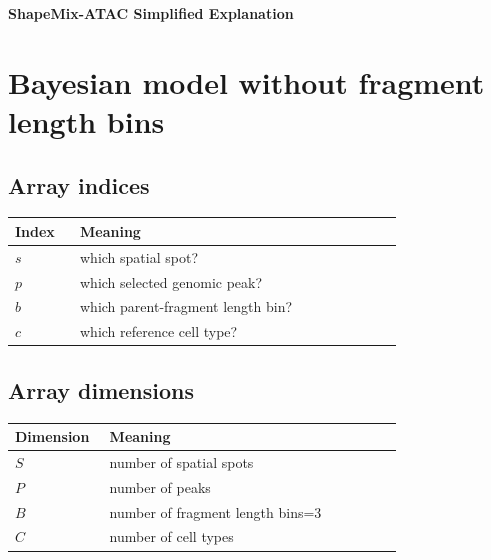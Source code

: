 \documentclass[11pt]{article}
\begin{document}
\hypersetup{pageanchor=false}

\begin{titlepage}
\centering
\vspace*{0.25in}
{\Huge\bfseries\color{navy} ShapeMix-ATAC Simplified Explanation\par}

\end{titlepage}

\hypersetup{pageanchor=true}
\setcounter{tocdepth}{1}
\tableofcontents
\newpage
{}

\section{Bayesian model without fragment length bins}



\subsection{Array indices}

\begin{center}
\begin{tabular}{C{0.11\linewidth}L{0.66\linewidth}}
\toprule
Index & Meaning \\
\midrule
\(s\) & which spatial spot? \\
\(p\) & which selected genomic peak? \\
\(b\) & which parent-fragment length bin? \\
\(c\) & which reference cell type? \\
\bottomrule
\end{tabular}
\end{center}

\subsection{Array dimensions}

\begin{center}
\begin{tabular}{C{0.11\linewidth}L{0.66\linewidth}}
\toprule
Dimension & Meaning \\
\midrule
\(S\) & number of spatial spots \\
\(P\) & number of peaks \\
\(B\) & number of fragment length bins=3 \\
\(C\) & number of cell types \\
\bottomrule
\end{tabular}
\end{center}
\end{document}
